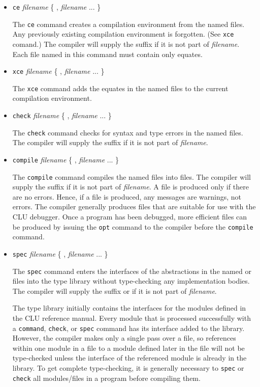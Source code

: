 \begin{itemize}
\item {\tt ce} {\it filename} \{ , {\it filename} ... \}

The {\tt ce} command creates a compilation environment from the named
 files.  Any previously existing compilation environment is
forgotten.  (See {\tt xce} comand.)  The compiler will supply the suffix
 if it is not part of {\it filename}.  Each file named in this
command must contain only equates.

\item {\tt xce} {\it filename} \{ , {\it filename} ... \}

The {\tt xce} command adds the equates in the named  files to the
current compilation environment.

\item {\tt check} {\it filename} \{ , {\it filename} ... \}

The {\tt check} command checks for syntax and type errors in the named
 files.  The compiler will supply the suffix  if it is 
not part of {\it filename}.

\item {\tt compile} {\it filename} \{ , {\it filename} ... \}

The {\tt compile} command compiles the named  files into 
files.  The compiler will supply the suffix  if it is not part of
{\it filename}.  A  file is produced only if there are no errors.
Hence, if a  file is produced, any messages are warnings, not errors.
The compiler generally produces  files that are suitable for use with
the CLU debugger.  Once a program has been debugged, more efficient 
files can be produced by issuing the {\tt opt} command to the compiler before
the {\tt compile} command.

\item {\tt spec} {\it filename} \{ , {\it filename} ... \}

The {\tt spec} command enters the interfaces of the abstractions in the named
 or  files into the type library without type-checking 
any implementation bodies.  The compiler will supply the suffix  or
 if it is not part of {\it filename}.

The type library initially contains the interfaces for the modules defined in
the CLU reference manual.  Every module that is processed successfully with a
{\tt command}, {\tt check}, or {\tt spec} command has its interface added to
the library.  However, the compiler makes only a single pass over a file, so
references within one module in a file to a module defined later in the file
will not be type-checked unless the interface of the referenced module is
already in the library.  To get complete type-checking, it is generally
necessary to {\tt spec} or {\tt check} all modules/files in a program before
compiling them.


\end{itemize}

